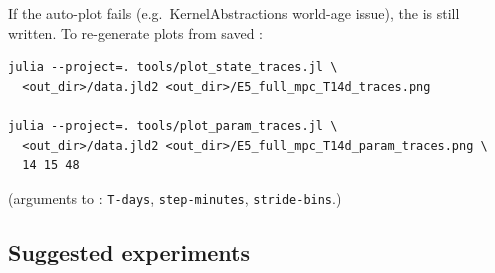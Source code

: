 \documentclass[11pt,a4paper]{article}
\begin{document}
If the auto-plot fails (e.g.\ KernelAbstractions world-age issue), the
 is still written. To re-generate plots from
saved :

\begin{verbatim}
julia --project=. tools/plot_state_traces.jl \
  <out_dir>/data.jld2 <out_dir>/E5_full_mpc_T14d_traces.png

julia --project=. tools/plot_param_traces.jl \
  <out_dir>/data.jld2 <out_dir>/E5_full_mpc_T14d_param_traces.png \
  14 15 48
\end{verbatim}

(arguments to : \texttt{T-days},
\texttt{step-minutes}, \texttt{stride-bins}.)

\subsection{Suggested experiments}
\end{document}
